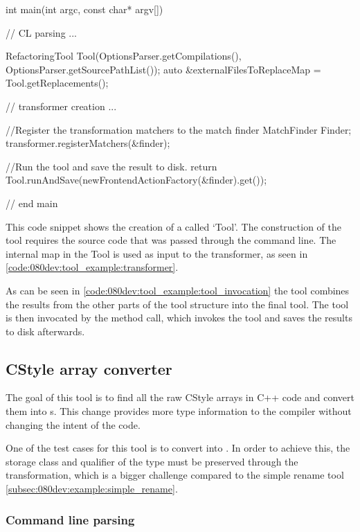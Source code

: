 \begin{listing}[H]
    \begin{cppcode}
int main(int argc, const char* argv[]) {
// CL parsing
...

RefactoringTool Tool(OptionsParser.getCompilations(),
                     OptionsParser.getSourcePathList());
auto &externalFilesToReplaceMap = Tool.getReplacements();

// transformer creation
...

//Register the transformation matchers to the match finder
MatchFinder Finder;
transformer.registerMatchers(&finder);

//Run the tool and save the result to disk.
return Tool.runAndSave(newFrontendActionFactory(&finder).get());
} // end main
    \end{cppcode}
    \caption{This code snippet shows the creation of a  called `Tool'. The construction of the tool requires the source code that was passed through the command line. The internal map in the Tool is used as input to the transformer, as seen in \cref{code:080dev:tool_example:transformer}.}
    \label{code:080dev:tool_example:tool_invocation}
\end{listing}

As can be seen in \cref{code:080dev:tool_example:tool_invocation} the tool combines the results from the other parts of the tool structure into the final tool. The tool is then invocated by the  method call, which invokes the tool and saves the results to disk afterwards. 

\subsection{CStyle array converter}

The goal of this tool is to find all the raw CStyle arrays in C++ code and convert them into s. This change provides more type information to the compiler without changing the intent of the code.

One of the test cases for this tool is to convert  into . In order to achieve this, the storage class and qualifier of the type must be preserved through the transformation, which is a bigger challenge compared to the simple rename tool \cref{subsec:080dev:example:simple_rename}.

\subsubsection*{Command line parsing}

